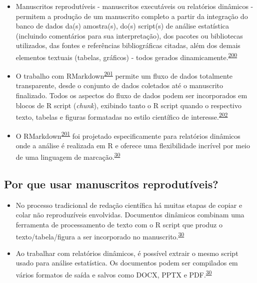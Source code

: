 \documentclass[
  a4paper,
]{book}
\begin{document}
\begin{itemize}
\item
  Manuscritos reprodutíveis - manuscritos executáveis ou relatórios dinâmicos - permitem a produção de um manuscrito completo a partir da integração do banco de dados da(s) amostra(s), do(s) script(s) de análise estatística (incluindo comentários para sua interpretação), dos pacotes ou bibliotecas utilizados, das fontes e referências bibliográficas citadas, além dos demais elementos textuais (tabelas, gráficos) - todos gerados dinamicamente.\textsuperscript{\protect\hyperlink{ref-hinsen2011}{200}}
\item
  O trabalho com RMarkdown\textsuperscript{\protect\hyperlink{ref-R-rmarkdown}{201}} permite um fluxo de dados totalmente transparente, desde o conjunto de dados coletados até o manuscrito finalizado. Todos os aspectos do fluxo de dados podem ser incorporados em blocos de R script (\emph{chunk}), exibindo tanto o R script quando o respectivo texto, tabelas e figuras formatadas no estilo científico de interesse.\textsuperscript{\protect\hyperlink{ref-holmes2021}{202}}
\item
  O RMarkdown\textsuperscript{\protect\hyperlink{ref-R-rmarkdown}{201}} foi projetado especificamente para relatórios dinâmicos onde a análise é realizada em R e oferece uma flexibilidade incrível por meio de uma linguagem de marcação.\textsuperscript{\protect\hyperlink{ref-mair2016}{30}}
\end{itemize}

\hypertarget{por-que-usar-manuscritos-reprodutuxedveis}{%
\subsection{Por que usar manuscritos reprodutíveis?}\label{por-que-usar-manuscritos-reprodutuxedveis}}

\begin{itemize}
\item
  No processo tradicional de redação científica há muitas etapas de copiar e colar não reproduzíveis envolvidas. Documentos dinâmicos combinam uma ferramenta de processamento de texto com o R script que produz o texto/tabela/figura a ser incorporado no manuscrito.\textsuperscript{\protect\hyperlink{ref-mair2016}{30}}
\item
  Ao trabalhar com relatórios dinâmicos, é possível extrair o mesmo script usado para análise estatística. Os documentos podem ser compilados em vários formatos de saída e salvos como DOCX, PPTX e PDF.\textsuperscript{\protect\hyperlink{ref-mair2016}{30}}
\end{itemize}
\end{document}
